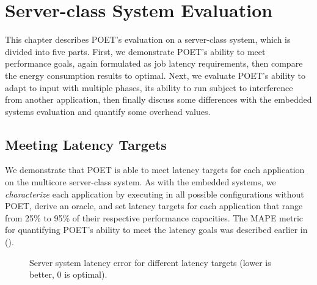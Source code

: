\section{Server-class System Evaluation}
\label{sec:poet-server-evaluation}

This chapter describes POET's evaluation on a server-class system, which is divided into five parts.
First, we demonstrate POET's ability to meet performance goals, again formulated as job latency requirements, then compare the energy consumption results to optimal.
Next, we evaluate POET's ability to adapt to input with multiple phases, its ability to run subject to interference from another application, then finally discuss some differences with the embedded systems evaluation and quantify some overhead values.


\subsection{Meeting Latency Targets}

We demonstrate that POET is able to meet latency targets for each application on the multicore server-class system.
As with the embedded systems, we \emph{characterize} each application by executing in all possible configurations without POET, derive an oracle, and set latency targets for each application that range from 25\% to 95\% of their respective performance capacities.
The MAPE metric for quantifying POET's ability to meet the latency goals was described earlier in  ().

\begin{figure}[t]
  \centering
    
  \caption{Server system latency error for different latency targets (lower is better, 0 is optimal).}
  \label{fig:poet-mape-server}
\end{figure}

